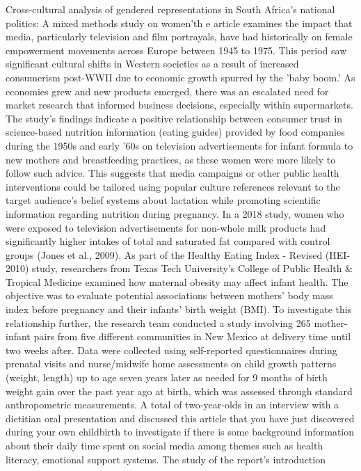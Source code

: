 \documentclass[12pt, a4paper]{article}
\begin{document}
{Cross-cultural analysis of gendered representations in South Africa's national politics: A mixed methods study on women’th e article examines the impact that media, particularly television and film portrayals, have had historically on female empowerment movements across Europe between 1945 to 1975. This period saw significant cultural shifts in Western societies as a result of increased consumerism post-WWII due to economic growth spurred by the 'baby boom.' As economies grew and new products emerged, there was an escalated need for market research that informed business decisions, especially within supermarkets. The study's findings indicate a positive relationship between consumer trust in science-based nutrition information (eating guides) provided by food companies during the 1950s and early '60s on television advertisements for infant formula to new mothers and breastfeeding practices, as these women were more likely to follow such advice. This suggests that media campaigns or other public health interventions could be tailored using popular culture references relevant to the target audience's belief systems about lactation while promoting scientific information regarding nutrition during pregnancy. In a 2018 study, women who were exposed to television advertisements for non-whole milk products had significantly higher intakes of total and saturated fat compared with control groups (Jones et al., 2009). As part of the Healthy Eating Index - Revised (HEI-2010) study, researchers from Texas Tech University's College of Public Health \& Tropical Medicine examined how maternal obesity may affect infant health. The objective was to evaluate potential associations between mothers’ body mass index before pregnancy and their infants' birth weight (BMI). To investigate this relationship further, the research team conducted a study involving 265 mother-infant pairs from five different communities in New Mexico at delivery time until two weeks after. Data were collected using self-reported questionnaires during prenatal visits and nurse/midwife home assessments on child growth patterns (weight, length) up to age seven years later as needed for 9 months of birth weight gain over the past year ago at birth, which was assessed through standard anthropometric measurements. A total of two-year-olds in an interview with a dietitian oral presentation and discussed this article that you have just discovered during your own childbirth to investigate if there is some background information about their daily time spent on social media among themes such as health literacy, emotional support systems. The study of the report's introduction

}
\end{document}
